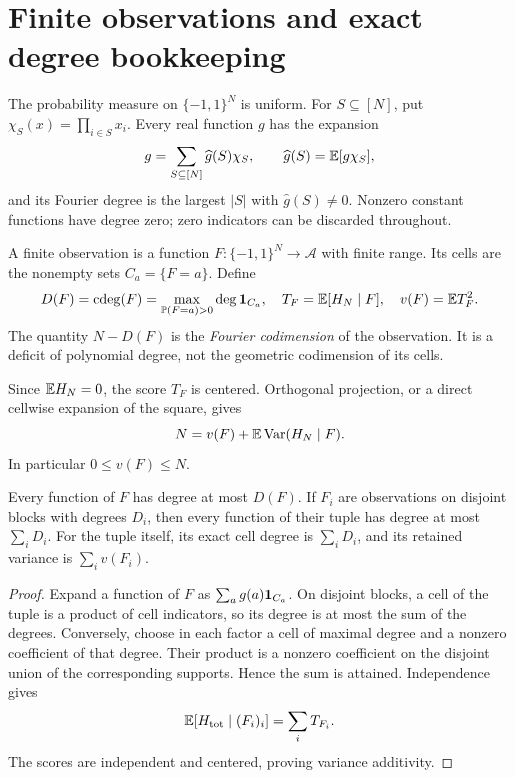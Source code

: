 \section{Finite observations and exact degree bookkeeping}
\label{sec:observations}

The probability measure on \(\{-1,1\}^N\) is uniform. For
\(S\subseteq[N]\), put \(\chi_S(x)=\prod_{i\in S}x_i\). Every real
function \(g\) has the expansion
\[
 g=\sum_{S\subseteq[N]}\widehat g(S)\chi_S,\qquad
 \widehat g(S)=\mathbb E[g\chi_S],
\]
and its Fourier degree is the largest \(|S|\) with
\(\widehat g(S)\ne0\). Nonzero constant functions have degree zero;
zero indicators can be discarded throughout.

\begin{definition}
A finite observation is a function \(F:\{-1,1\}^N\to\mathcal A\) with
finite range. Its cells are the nonempty sets \(C_a=\{F=a\}\). Define
\[
 D(F)=\operatorname{cdeg}(F)=\max_{\mathbb P(F=a)>0}\deg\mathbf 1_{C_a},\quad
 T_F=\mathbb E[H_N\mid F],\quad
 v(F)=\mathbb E T_F^2.
\]
The quantity \(N-D(F)\) is the \emph{Fourier codimension} of the
observation. It is a deficit of polynomial degree, not the geometric
codimension of its cells.
\end{definition}

Since \(\mathbb E H_N=0\), the score \(T_F\) is centered. Orthogonal projection,
or a direct cellwise expansion of the square, gives
\begin{equation}\label{eq:total-variance}
 N=v(F)+\mathbb E\operatorname{Var}(H_N\mid F).
\end{equation}
In particular \(0\le v(F)\le N\).

\begin{lemma}\label{lem:observation-calculus}
Every function of \(F\) has degree at most \(D(F)\). If \(F_i\) are
observations on disjoint blocks with degrees \(D_i\), then every
function of their tuple has degree at most \(\sum_iD_i\).
For the tuple itself, its exact cell degree is \(\sum_iD_i\), and its
retained variance is \(\sum_iv(F_i)\).
\end{lemma}

\begin{proof}
Expand a function of \(F\) as
\(\sum_a g(a)\mathbf 1_{C_a}\). On disjoint blocks, a cell of the tuple is a
product of cell indicators, so its degree is at most the sum of the
degrees. Conversely, choose in each factor a cell of maximal degree
and a nonzero coefficient of that degree. Their product is a nonzero
coefficient on the disjoint union of the corresponding supports.
Hence the sum is attained. Independence gives
\[
 \mathbb E[H_{\mathrm{tot}}\mid(F_i)_i]=\sum_iT_{F_i}.
\]
The scores are independent and centered, proving variance additivity.
\end{proof}

